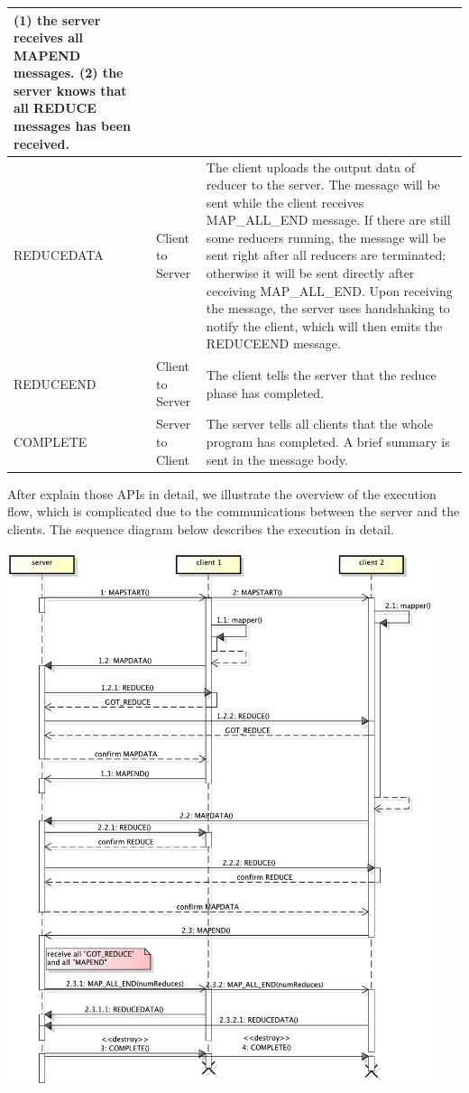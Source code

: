 \begin{center}
\begin{tabular}{| l | l | p{7.5cm} |}
(1) the server receives all MAPEND messages. \newline
(2) the server knows that all REDUCE messages has been received. \\
\hline
REDUCEDATA & Client to Server & The client uploads the output data of reducer to the server. \newline
The message will be sent while the client receives MAP\_ALL\_END message. If there are still some reducers running, the message will be sent right after all reducers are terminated; otherwise it will be sent directly after ceceiving MAP\_ALL\_END. \newline
Upon receiving the message, the server uses handshaking to notify the client, which will then emits the REDUCEEND message. \\
\hline
REDUCEEND & Client to Server & The client tells the server that the reduce phase has completed. \\
\hline
COMPLETE & Server to Client & The server tells all clients that the whole program has completed. A brief summary is sent in the message body. \\
\hline

\end{tabular}

\end{center}

After explain those APIs in detail, we illustrate the overview of the execution flow, which is complicated due to the communications between the server and the clients. The sequence diagram below describes the execution in detail.

\includegraphics[width=12.5cm, keepaspectratio=true]{JSMP.png}
